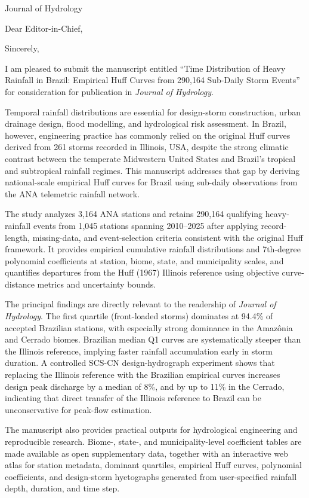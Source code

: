 \documentclass[10pt,a4paper,roman]{moderncv}
\begin{document}
{Journal of Hydrology}
\date{\today}
\opening{Dear Editor-in-Chief,}
\closing{Sincerely,}

\makelettertitle
\footnotesize

I am pleased to submit the manuscript entitled ``Time Distribution of Heavy Rainfall in Brazil: Empirical Huff Curves from 290,164 Sub-Daily Storm Events'' for consideration for publication in \textit{Journal of Hydrology}.

Temporal rainfall distributions are essential for design-storm construction, urban drainage design, flood modelling, and hydrological risk assessment. In Brazil, however, engineering practice has commonly relied on the original Huff curves derived from 261 storms recorded in Illinois, USA, despite the strong climatic contrast between the temperate Midwestern United States and Brazil's tropical and subtropical rainfall regimes. This manuscript addresses that gap by deriving national-scale empirical Huff curves for Brazil using sub-daily observations from the ANA telemetric rainfall network.

The study analyzes 3,164 ANA stations and retains 290,164 qualifying heavy-rainfall events from 1,045 stations spanning 2010--2025 after applying record-length, missing-data, and event-selection criteria consistent with the original Huff framework. It provides empirical cumulative rainfall distributions and 7th-degree polynomial coefficients at station, biome, state, and municipality scales, and quantifies departures from the Huff (1967) Illinois reference using objective curve-distance metrics and uncertainty bounds.

The principal findings are directly relevant to the readership of \textit{Journal of Hydrology}. The first quartile (front-loaded storms) dominates at 94.4\% of accepted Brazilian stations, with especially strong dominance in the Amaz\^onia and Cerrado biomes. Brazilian median Q1 curves are systematically steeper than the Illinois reference, implying faster rainfall accumulation early in storm duration. A controlled SCS-CN design-hydrograph experiment shows that replacing the Illinois reference with the Brazilian empirical curves increases design peak discharge by a median of 8\%, and by up to 11\% in the Cerrado, indicating that direct transfer of the Illinois reference to Brazil can be unconservative for peak-flow estimation.

The manuscript also provides practical outputs for hydrological engineering and reproducible research. Biome-, state-, and municipality-level coefficient tables are made available as open supplementary data, together with an interactive web atlas for station metadata, dominant quartiles, empirical Huff curves, polynomial coefficients, and design-storm hyetographs generated from user-specified rainfall depth, duration, and time step.
\end{document}
